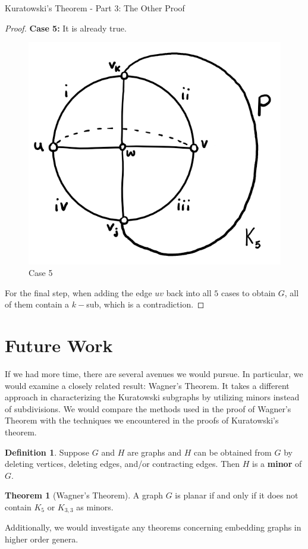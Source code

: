 \documentclass[12pt]{article}
\theoremstyle{definition}
\newtheorem{thrm}{Theorem}[section]
\newtheorem{defn}{Definition}[section]
\begin{document}
\begin{section}{Kuratowski's Theorem - Part 3: The Other Proof}
\begin{proof}
\textbf{Case 5:} It is already true.

\begin{figure}[hbt!]
    \centering
    \includegraphics[width=0.3\linewidth]{graphs/case_5.png}
    \caption{Case 5}
\end{figure}

\noindent For the final step, when adding the edge $uv$ back into all $5$ cases to obtain $G$, all of them contain a $k-$sub, which is a contradiction.

\end{proof}

\end{section}

\section{Future Work}

If we had more time, there are several avenues we would pursue. In particular, we would examine a closely related result: Wagner's Theorem. It takes a different approach in characterizing the Kuratowski subgraphs by utilizing minors instead of subdivisions. We would compare the methods used in the proof of Wagner's Theorem with the techniques we encountered in the proofs of Kuratowski's theorem.
\begin{bluebox}
        \begin{defn}
            Suppose $G$ and $H$ are graphs and $H$ can be obtained from $G$ by deleting vertices, deleting edges, and/or contracting edges. Then $H$ is a \textbf{minor} of $G$.
        \end{defn}
    \end{bluebox}

\begin{greenbox}
    \begin{thrm}[Wagner's Theorem]
        A graph $G$ is planar if and only if it does not contain $K_5$ or $K_{3,3}$ as minors.
    \end{thrm}
\end{greenbox}

Additionally, we would investigate any theorems concerning embedding graphs in higher order genera.
\end{document}
